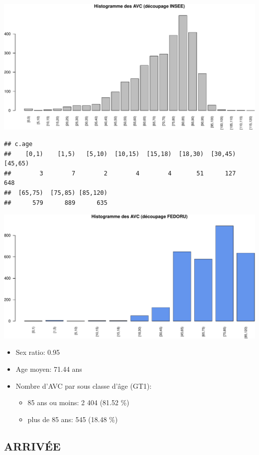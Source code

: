 \documentclass[]{article}
\begin{document}
\includegraphics{Figs/Patients-1.pdf}

\begin{verbatim}
## c.age
##    [0,1)    [1,5)   [5,10)  [10,15)  [15,18)  [18,30)  [30,45)  [45,65) 
##        3        7        2        4        4       51      127      648 
##  [65,75)  [75,85) [85,120) 
##      579      889      635
\end{verbatim}

\includegraphics{Figs/Patients-2.pdf}

\begin{itemize}
\itemsep1pt\parskip0pt
\item
  Sex ratio: 0.95
\item
  Age moyen: 71.44 ans
\item
  Nombre d'AVC par sous classe d'âge (GT1):

  \begin{itemize}
  \itemsep1pt\parskip0pt
  \item
    85 ans ou moins: 2 404 (81.52 \%)
  \item
    plus de 85 ans: 545 (18.48 \%)
  \end{itemize}
\end{itemize}

\subsection{ARRIVÉE}\label{arrivee-2}
\end{document}
